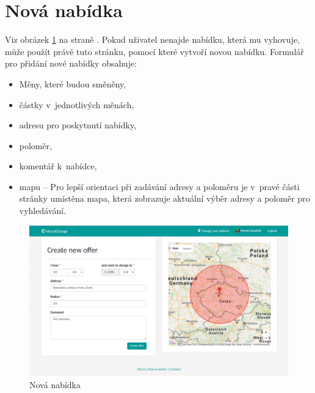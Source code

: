 \section{Nová nabídka}

\label{nur:new-offer}

Viz obrázek \ref{fig:tur:new-offer} na straně \pageref{fig:tur:new-offer}. Pokud uživatel nenajde nabídku, která mu vyhovuje, může použít právě tuto stránku, pomocí které vytvoří novou nabídku. Formulář pro přidání nové nabídky obsahuje:
\begin{itemize}
    \item Měny, které budou směněny,
    \item částky v~jednotlivých měnách,
	\item adresu pro poskytnutí nabídky,
	\item poloměr,
	\item komentář k~nabídce,
	\item mapu -- Pro lepší orientaci při zadávání adresy a poloměru je v~pravé části stránky umístěna mapa, která zobrazuje aktuální výběr adresy a poloměr pro vyhledávání.
\end{itemize}

\begin{figure}[!h]
    \centering
    \includegraphics[width=1.0\textwidth]{media/tur/new-offer.png}
    \caption{Nová nabídka}
    \label{fig:tur:new-offer}
\end{figure}